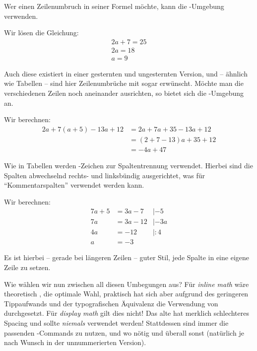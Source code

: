 Wer einen Zeilenumbruch in seiner Formel möchte, kann die -Umgebung verwenden.
\begin{latexlisting}
	Wir lösen die Gleichung:
	\begin{gather*}
		2a + 7 = 25 \\
		2a = 18\\
		a = 9
	\end{gather*}
\end{latexlisting}
Auch diese existiert in einer gesternten und ungesternten Version, und -- ähnlich wie Tabellen -- sind hier Zeilenumbrüche mit \latexcommand{\textbackslash} sogar erwünscht.
Möchte man die verschiedenen Zeilen noch aneinander ausrichten, so bietet sich die -Umgebung an.
\begin{latexlisting}
	Wir berechnen:
	\begin{gather*}
		2a + 7(a + 5) - 13a + 12
		&= 2a + 7a + 35 - 13a + 12 \\
		&= (2 + 7 - 13)a + 35 + 12 \\
		&= -4a + 47
	\end{gather*}
\end{latexlisting}
Wie in Tabellen werden \key{\&}-Zeichen zur Spaltentrennung verwendet.
Hierbei sind die Spalten abwechselnd rechts- und linksbündig ausgerichtet, was für \enquote{Kommentarspalten} verwendet werden kann.
\begin{latexlisting}
	Wir berechnen:
	\begin{gather*}
		7a + 5
		&= 3a - 7
		&| -5 \\
		7a 
		&= 3a - 12
		&| -3a \\
		4a
		&= -12
		&| :4 \\
		a
		&= -3
	\end{gather*}
\end{latexlisting}
Es ist hierbei -- gerade bei längeren Zeilen -- guter Stil, jede Spalte in eine eigene Zeile zu setzen.

Wie wählen wir nun zwischen all diesen Umbegungen aus?
Für \emph{inline math} wäre theoretisch \latexcommand{(}, \latexcommand{)} die optimale Wahl, praktisch hat sich aber aufgrund des geringeren Tippaufwands und der typografischen Äquivalenz die Verwendung von \key{\$} durchgesetzt.
Für \emph{display math} gilt dies nicht!
Das alte \key{\$\$} hat merklich schlechteres Spacing und sollte \emph{niemals} verwendet werden!
Stattdessen sind immer die passenden -Commands zu nutzen,  und  wo nötig und  überall sonst (natürlich je nach Wunsch in der unnummerierten Version).

